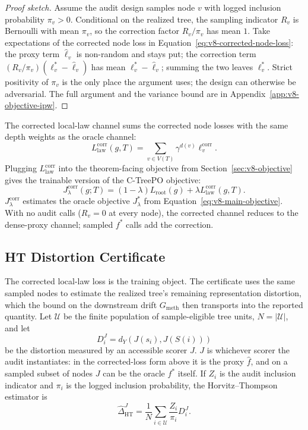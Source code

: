 \begin{proof}[Proof sketch]
Assume the audit design samples node \(v\) with logged inclusion
probability \(\pi_v>0\). Conditional on the realized tree, the
sampling indicator \(R_v\) is Bernoulli with mean \(\pi_v\), so the
correction factor \(R_v/\pi_v\) has mean \(1\). Take expectations of
the corrected node loss in
Equation~\eqref{eq:v8-corrected-node-loss}: the proxy term
\(\widehat\ell_v\) is non-random and stays put; the correction term
\((R_v/\pi_v)(\ell_v^\ast-\widehat\ell_v)\) has mean
\(\ell_v^\ast-\widehat\ell_v\); summing the two leaves
\(\ell_v^\ast\). Strict positivity of \(\pi_v\) is the only place the
argument uses; the design can otherwise be adversarial. The full
argument and the variance bound are in
Appendix~\ref{app:v8-objective-ipw}.
\end{proof}

The corrected local-law channel sums the corrected node losses with
the same depth weights as the oracle channel:
\[
  L_{\mathrm{law}}^{\mathrm{corr}}(g,T)
  =
  \sum_{v\in V(T)}\gamma^{d(v)}\ell_v^{\mathrm{corr}} .
\]
Plugging \(L_{\mathrm{law}}^{\mathrm{corr}}\) into the
theorem-facing objective from Section~\ref{sec:v8-objective} gives
the trainable version of the C-TreePO objective:
\begin{equation}
\label{eq:v8-corrected-objective}
  J_\lambda^{\mathrm{corr}}(g;T)
  =
  (1-\lambda)L_{\mathrm{root}}(g)
  +
  \lambda L_{\mathrm{law}}^{\mathrm{corr}}(g,T).
\end{equation}
\(J_\lambda^{\mathrm{corr}}\) estimates the oracle objective
\(J_\lambda^\ast\) from
Equation~\eqref{eq:v8-main-objective}. With no audit calls
(\(R_v=0\) at every node), the corrected channel reduces to the
dense-proxy channel; sampled \(f^\ast\) calls add the correction.

\subsection{HT Distortion Certificate}

The corrected local-law loss is the training object. The certificate
uses the same sampled nodes to estimate the realized tree's
remaining representation distortion, which the bound on the
downstream drift \(G_{\mathrm{meth}}\) then transports into the
reported quantity. Let \(\mathcal U\) be the finite population of
sample-eligible tree units, \(N=|\mathcal U|\), and let
\[
  D_i^J
  =
  d_Y\!\left(J(s_i),J(S(i))\right)
\]
be the distortion measured by an accessible scorer \(J\). \(J\) is
whichever scorer the audit instantiates: in the corrected-loss form
above it is the proxy \(\widehat f\), and on a sampled subset of nodes
\(J\) can be the oracle \(f^\ast\) itself. If \(Z_i\) is the audit
inclusion indicator and \(\pi_i\) is the logged inclusion probability,
the Horvitz--Thompson estimator is
\begin{equation}
\label{eq:v8-ht-distortion}
  \widehat{\Delta}_{\mathrm{HT}}^{J}
  =
  \frac{1}{N}
  \sum_{i\in\mathcal U}
  \frac{Z_i}{\pi_i}D_i^J .
\end{equation}


